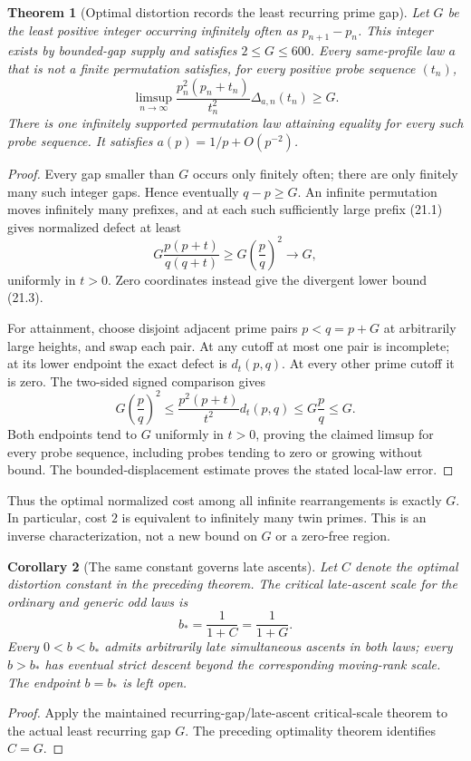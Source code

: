 \documentclass[11pt]{article}
\newtheorem{theorem}{Theorem}[section]
\newtheorem{corollary}[theorem]{Corollary}
\theoremstyle{definition}
\begin{document}
\begin{theorem}[Optimal distortion records the least recurring prime gap]
Let $G$ be the least positive integer occurring infinitely often as
$p_{n+1}-p_n$. This integer exists by bounded-gap supply and satisfies
$2\le G\le600$. Every same-profile law $a$ that is not a finite
permutation satisfies, for every positive probe sequence $(t_n)$,
\[
 \limsup_{n\to\infty}
 \frac{p_n^2(p_n+t_n)}{t_n^2}\Delta_{a,n}(t_n)\ge G.
\]
There is one infinitely supported permutation law attaining equality
for every such probe sequence. It satisfies
$a(p)=1/p+O(p^{-2})$.
\end{theorem}
\begin{proof}
Every gap smaller than $G$ occurs only finitely often; there are only
finitely many such integer gaps. Hence eventually $q-p\ge G$.
An infinite permutation moves infinitely many prefixes, and at each
such sufficiently large prefix (21.1) gives normalized defect at least
\[
 G\frac{p(p+t)}{q(q+t)}
 \ge G\left(\frac pq\right)^2\longrightarrow G,
\]
uniformly in $t>0$. Zero coordinates instead give the divergent
lower bound (21.3).

For attainment, choose disjoint adjacent prime pairs $p<q=p+G$
at arbitrarily large heights, and swap each pair. At any cutoff at
most one pair is incomplete; at its lower endpoint the exact defect
is $d_t(p,q)$. At every other prime cutoff it is zero.
The two-sided signed comparison gives
\[
 G\left(\frac pq\right)^2
 \le \frac{p^2(p+t)}{t^2}d_t(p,q)
 \le G\frac pq\le G.
\]
Both endpoints tend to $G$ uniformly in $t>0$, proving the claimed
limsup for every probe sequence, including probes tending to zero or
growing without bound. The bounded-displacement estimate proves the
stated local-law error.
\end{proof}

Thus the optimal normalized cost among all infinite rearrangements is
exactly $G$. In particular, cost $2$ is equivalent to infinitely many
twin primes. This is an inverse characterization, not a new bound
on $G$ or a zero-free region.

\begin{corollary}[The same constant governs late ascents]
Let $C$ denote the optimal distortion constant in the preceding theorem.
The critical late-ascent scale for the ordinary and generic odd laws is
\[
 b_*=\frac{1}{1+C}=\frac{1}{1+G}.
\]
Every $0<b<b_*$ admits arbitrarily late simultaneous ascents in both
laws; every $b>b_*$ has eventual strict descent beyond the corresponding
moving-rank scale. The endpoint $b=b_*$ is left open.
\end{corollary}
\begin{proof}
Apply the maintained recurring-gap/late-ascent critical-scale theorem
to the actual least recurring gap $G$. The preceding optimality theorem
identifies $C=G$.
\end{proof}
\end{document}
